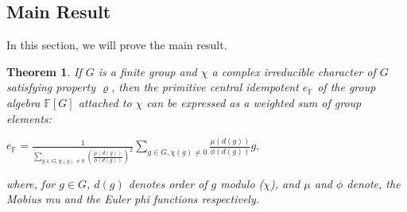\documentclass[12pt, reqno]{amsart}
\numberwithin{equation}{section}
\theoremstyle{definition}
\theoremstyle{remark}
\theoremstyle{plain}
\newtheorem{theorem}[definition]{Theorem}
\begin{document}
\subsection{Main Result}
In this section, we will prove the main result.
\begin{theorem}\label{T: complex}
If $G$ is a finite group and $\chi$ a complex irreducible character of $G$ satisfying property $\varrho$, then the primitive central idempotent $e_{\mathbb{F}}$ of the group algebra $\mathbb{F}[G]$ attached to $\chi$ can be expressed as a weighted sum of group elements:
  \begin{center}
    $e_{\mathbb{F}}= \frac{1}{\sum_{g\in G, \chi(g)\neq 0}(\frac{\mu(d(g))}{\phi(d(g))})^{2}}\sum_{g\in G, \chi(g)\neq 0}\frac{\mu(d(g))}{\phi(d(g))}g,$  
  \end{center}
  where, for $g\in G$, $d(g)$ denotes order of $g$ modulo ($\chi$), and $\mu$ and $\phi$ denote, the Mobius mu and the Euler phi functions respectively.
  \end{theorem}
\end{document}
